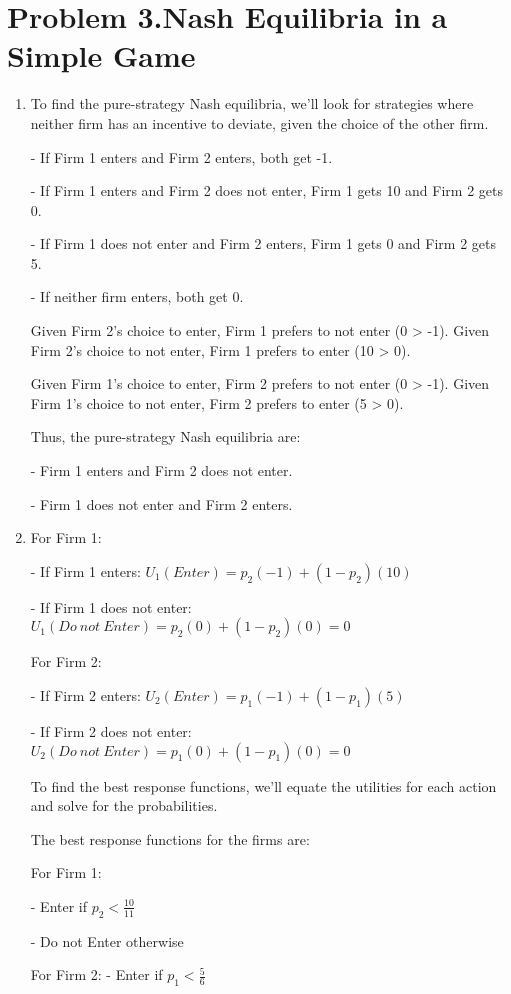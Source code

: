 \documentclass[UTF8,titlepage]{article}
\numberwithin{figure}{section}
\begin{document}
\clearpage
\section{Problem 3.Nash Equilibria in a Simple Game}
\begin{enumerate}
\item To find the pure-strategy Nash equilibria, we'll look for strategies where neither firm has an incentive to deviate, given the choice of the other firm.

- If Firm 1 enters and Firm 2 enters, both get -1.

- If Firm 1 enters and Firm 2 does not enter, Firm 1 gets 10 and Firm 2 gets 0.

- If Firm 1 does not enter and Firm 2 enters, Firm 1 gets 0 and Firm 2 gets 5.

- If neither firm enters, both get 0.

Given Firm 2's choice to enter, Firm 1 prefers to not enter (0 > -1). Given Firm 2's choice to not enter, Firm 1 prefers to enter (10 > 0).

Given Firm 1's choice to enter, Firm 2 prefers to not enter (0 > -1). Given Firm 1's choice to not enter, Firm 2 prefers to enter (5 > 0).

Thus, the pure-strategy Nash equilibria are:

- Firm 1 enters and Firm 2 does not enter.

- Firm 1 does not enter and Firm 2 enters.

\item For Firm 1:

- If Firm 1 enters: \( U_1(Enter) = p_2(-1) + (1-p_2)(10) \)

- If Firm 1 does not enter: \( U_1(Do \ not \ Enter) = p_2(0) + (1-p_2)(0) = 0 \)

For Firm 2:

- If Firm 2 enters: \( U_2(Enter) = p_1(-1) + (1-p_1)(5) \)

- If Firm 2 does not enter: \( U_2(Do \ not \ Enter) = p_1(0) + (1-p_1)(0) = 0 \)

To find the best response functions, we'll equate the utilities for each action and solve for the probabilities.

The best response functions for the firms are:

For Firm 1:

- Enter if \( p_2 < \frac{10}{11} \)

- Do not Enter otherwise

For Firm 2:
- Enter if \( p_1 < \frac{5}{6} \)


\end{enumerate}
\end{document}
